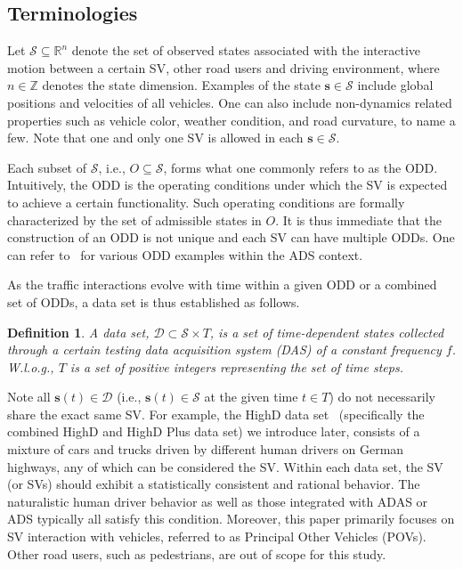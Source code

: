 \documentclass[journal]{IEEEtran}
\newtheorem{definition}{Definition}
\newcommand{\R}{\mathbb{R}}
\newcommand{\Z}{\mathbb{Z}}
\newcommand{\s}{\mathbf{s}}
\begin{document}
\subsection{Terminologies}\label{sec:preliminaries:terminologies}
Let $\mathcal{S} \subseteq \R^n$ denote the set of observed states associated with the interactive motion between a certain SV, other road users and driving environment, where $n \in \Z$ denotes the state dimension. Examples of the state $\s \in \mathcal{S}$ include global positions and velocities of all vehicles. One can also include non-dynamics related properties such as vehicle color, weather condition, and road curvature, to name a few. Note that one and only one SV is allowed in each $\s \in \mathcal{S}$.

Each subset of $\mathcal{S}$, i.e., $O \subseteq \mathcal{S}$, forms what one commonly refers to as the ODD. Intuitively, the ODD is the operating conditions under which the SV is expected to achieve a certain functionality. Such operating conditions are formally characterized by the set of admissible states in $O$. It is thus immediate that the construction of an ODD is not unique and each SV can have multiple ODDs. One can refer to~\cite{czarnecki2018operational,weng2023finite} for various ODD examples within the ADS context. 

As the traffic interactions evolve with time within a given ODD or a combined set of ODDs, a data set is thus established as follows.
\begin{definition}
A data set, $\mathcal{D} \subset \mathcal{S} \times T$, is a set of time-dependent states collected through a certain testing data acquisition system (DAS) of a constant frequency $f$. W.l.o.g., $T$ is a set of positive integers representing the set of time steps.
\end{definition}
Note all $\s(t) \in \mathcal{D}$ (i.e., $\s(t) \in \mathcal{S}$ at the given time $t \in T$) do not necessarily share the exact same SV. For example, the HighD data set~\cite{krajewski2018highd} (specifically the combined HighD and HighD Plus data set) we introduce later, consists of a mixture of cars and trucks driven by different human drivers on German highways, any of which can be considered the SV. Within each data set, the SV (or SVs) should exhibit a statistically consistent and rational behavior. The naturalistic human driver behavior as well as those integrated with ADAS or ADS typically all satisfy this condition. Moreover, this paper primarily focuses on SV interaction with vehicles, referred to as Principal Other Vehicles (POVs). Other road users, such as pedestrians, are out of scope for this study.
\end{document}
